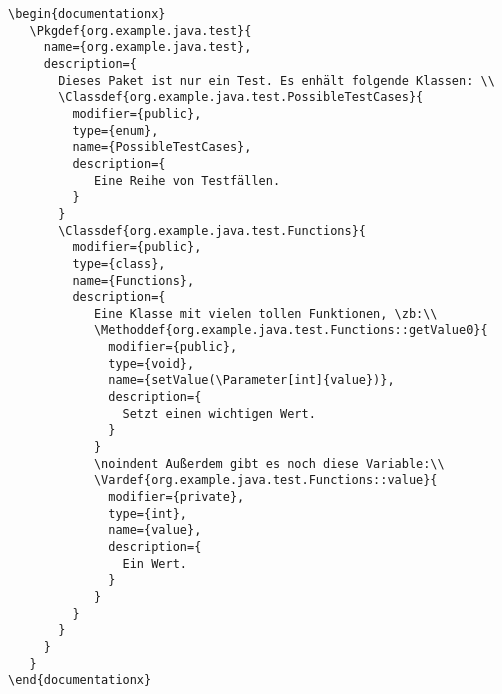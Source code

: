 			\newpage
			\enlargethispage*{1em}
			\begin{verbatim}
\begin{documentationx}
   \Pkgdef{org.example.java.test}{
     name={org.example.java.test},
     description={
       Dieses Paket ist nur ein Test. Es enhält folgende Klassen: \\
       \Classdef{org.example.java.test.PossibleTestCases}{
         modifier={public},
         type={enum},
         name={PossibleTestCases},
         description={
            Eine Reihe von Testfällen.
         }
       }
       \Classdef{org.example.java.test.Functions}{
         modifier={public},
         type={class},
         name={Functions},
         description={
            Eine Klasse mit vielen tollen Funktionen, \zb:\\
            \Methoddef{org.example.java.test.Functions::getValue0}{
              modifier={public},
              type={void},
              name={setValue(\Parameter[int]{value})},
              description={
                Setzt einen wichtigen Wert.
              }
            }
            \noindent Außerdem gibt es noch diese Variable:\\
            \Vardef{org.example.java.test.Functions::value}{
              modifier={private},
              type={int},
              name={value},
              description={
                Ein Wert.
              }
            }
         }
       }
     }
   }
\end{documentationx}
			\end{verbatim}

	\noindent\makebox[\linewidth]{\rule{.7\paperwidth}{0.4pt}}
				\begin{documentationx}
				\end{documentationx}

